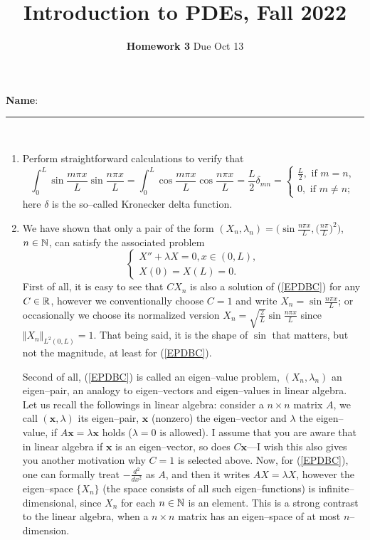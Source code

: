 \documentclass[6pt]{article}
\title{Introduction to PDEs, Fall 2022}
\author{\textbf{Homework 3} Due Oct 13}
\date{}
\numberwithin{equation}{section}
\def\mathbb{\Bbb}
\begin{document}
\maketitle

\textbf{Name}:\rule{1 in}{0.001 in} \\
\begin{enumerate}
\item
Perform straightforward calculations to verify that
\begin{equation*}
\int_0^L \sin \frac{m\pi x}{L} \sin \frac{n\pi x}{L}=\int_0^L \cos \frac{m\pi x}{L} \cos \frac{n\pi x}{L}=\frac{L}{2}\delta_{mn}=
\left\{
\begin{array}{ll}
\frac{L}{2},\text{~if~}m=n,\\
0,\text{~if~}m\neq n;
\end{array}
\right.
\end{equation*}
here $\delta$ is the so--called Kronecker delta function.

\item We have shown that only a pair of the form $(X_n,\lambda_n)=\Big(\sin \frac{n\pi x}{L}, \big(\frac{n\pi }{L}\big)^2\Big)$, $n\in\mathbb N$, can satisfy the associated problem
\begin{equation}\label{EPDBC}
\left\{
\begin{array}{ll}
X''+\lambda X=0, x\in (0,L),\\
X(0)=X(L)=0.
\end{array}
\right.
\end{equation}
First of all, it is easy to see that $CX_n$ is also a solution of (\ref{EPDBC}) for any $C\in\mathbb R$, however we conventionally choose $C=1$ and write $X_n=\sin \frac{n\pi x}{L}$; or occasionally we choose its normalized version $X_n=\sqrt{\frac{2}{L}}\sin \frac{n\pi x}{L}$ since $\Vert X_n\Vert_{L^2(0,L)}=1$.  That being said, it is the shape of $\sin $ that matters, but not the magnitude, at least for (\ref{EPDBC}).


Second of all, (\ref{EPDBC}) is called an eigen--value problem, $(X_n,\lambda_n)$ an eigen--pair, an analogy to eigen--vectors and eigen--values in linear algebra.  Let us recall the followings in linear algebra: consider a $n\times n$ matrix $A$, we call $(\textbf{x},\lambda)$ its eigen--pair, $\textbf{x}$ (nonzero) the eigen--vector and $\lambda$ the eigen--value, if $A\textbf{x}=\lambda \textbf{x}$ holds ($\lambda=0$ is allowed).  I assume that you are aware that in linear algebra if $\textbf{x}$ is an eigen--vector, so does $C\textbf{x}$---I wish this also gives you another motivation why $C=1$ is selected above.  Now, for (\ref{EPDBC}), one can formally treat $-\frac{d^2}{dx^2}$ as $A$, and then it writes $AX=\lambda X$, however the eigen--space $\{X_n\}$ (the space consists of all such eigen--functions) is infinite--dimensional, since $X_n$ for each $n\in\mathbb N$ is an element.  This is a strong contrast to the linear algebra, when a $n\times n$ matrix has an eigen--space of at most $n$--dimension.


\end{enumerate}
\end{document}
